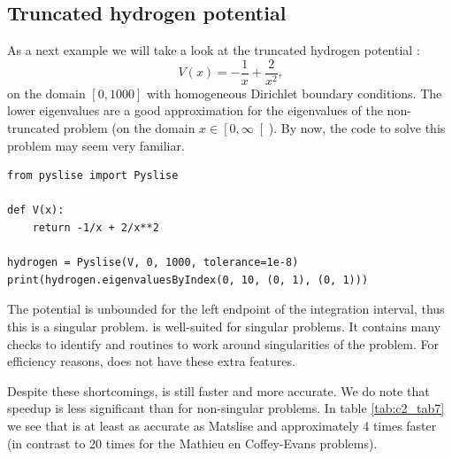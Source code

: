 \subsection{Truncated hydrogen potential}

As a next example we will take a look at the truncated hydrogen potential \cite{pryce_sltstpak_1999}:
\begin{equation}
    V(x) = -\frac{1}{x} + \frac{2}{x^2}\text{,} \label{equ:c2_truncated_hydrogen}
\end{equation}
on the domain $[0, 1000]$ with homogeneous Dirichlet boundary conditions. The lower eigenvalues are a good approximation for the eigenvalues of the non-truncated problem (on the domain $x \in \left[0, \infty\right[$). By now, the code to solve this problem may seem very familiar.

\begin{verbatim}
from pyslise import Pyslise

def V(x):
    return -1/x + 2/x**2

hydrogen = Pyslise(V, 0, 1000, tolerance=1e-8)
print(hydrogen.eigenvaluesByIndex(0, 10, (0, 1), (0, 1)))
\end{verbatim}

The potential is unbounded for the left endpoint of the integration interval, thus this is a singular problem.  is well-suited for singular problems. It contains many checks to identify and routines to work around singularities of the problem. For efficiency reasons, \pyslise{} does not have these extra features.

Despite these shortcomings, \pyslise{} is still faster and more accurate. We do note that speedup is less significant than for non-singular problems. In table \ref{tab:c2_tab7} we see that \pyslise{} is at least as accurate as Matslise and approximately 4 times faster (in contrast to 20 times for the Mathieu en Coffey-Evans problems).

